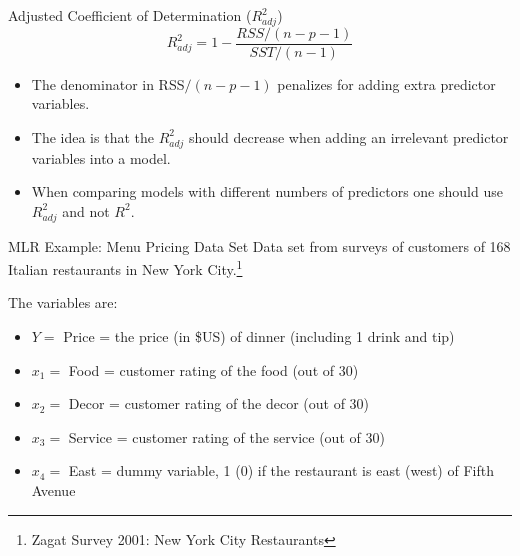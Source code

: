 \documentclass[10pt]{beamer}
\begin{document}
\begin{frame}{Adjusted Coefficient of Determination ($R^2_{adj}$)}
$$R^2_{adj} = 1 - \frac{RSS / (n-p-1)}{SST/(n-1)}$$
\begin{itemize}
\item The denominator in RSS$/(n-p-1)$ penalizes for adding extra predictor variables.\\
\vspace{5pt}
\item The idea is that the $R^2_{adj}$ should decrease when adding an irrelevant predictor variables into a model.\\
\vspace{5pt}
\item When comparing models with different numbers of predictors one should use $R^2_{adj}$ and not $R^2$.
\end{itemize}
\end{frame}


\begin{frame}{MLR Example: Menu Pricing Data Set}
Data set from surveys of customers of 168 Italian restaurants in New York City.\footnote{Zagat Survey 2001: New York City Restaurants} 
\vspace{10pt}

The variables are:
\begin{itemize}
\item $Y =$ Price = the price (in \$US) of dinner (including 1 drink and tip)
\item $x_1 =$ Food = customer rating of the food (out of 30)
\item $x_2 =$ Decor = customer rating of the decor (out of 30)
\item $x_3 =$ Service = customer rating of the service (out of 30)
\item $x_4 =$ East = dummy variable, 1 (0) if the restaurant is east (west) of Fifth Avenue
\end{itemize}
\end{frame}
\end{document}
